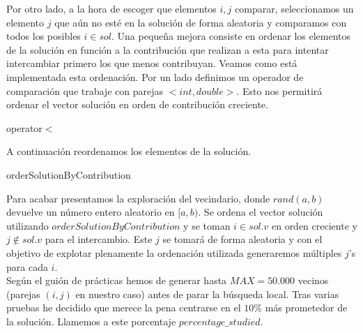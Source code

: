\documentclass[11pt,a4paper]{article}
\begin{document}
	Por otro lado, a la hora de escoger que elementos $i,j$ comparar, seleccionamos un elemento $j$ que aún no esté en la solución de forma aleatoria y comparamos con todos los posibles $i \in sol$. Una pequeña mejora consiste en ordenar los elementos de la solución en función a la contribución que realizan a esta para intentar intercambiar primero los que menos contribuyan. Veamos como está implementada esta ordenación. Por un lado definimos un operador de comparación que trabaje con parejas $<int, double>$. Esto nos permitirá ordenar el vector solución en orden de contribución creciente. \\
	
	\begin{algorithm}[H]
	 	\caption{operator$<$}
	\end{algorithm}

	A continuación reordenamos los elementos de la solución. \\

	\begin{algorithm}[H]
		\caption{orderSolutionByContribution}
	\end{algorithm}

	Para acabar presentamos la exploración del vecindario, donde $rand(a,b)$ devuelve un número entero aleatorio en $[a,b)$. Se ordena el vector solución utilizando $orderSolutionByContribution$ y se toman $i \in sol.v$ en orden creciente y $j \notin sol.v$ para el intercambio. Este $j$ se tomará de forma aleatoria y con el objetivo de explotar plenamente la ordenación utilizada generaremos múltiples $j$'s para cada $i$. \\
	
	Según el guión de prácticas hemos de generar hasta $MAX = 50.000$ vecinos (parejas $(i,j)$ en nuestro caso) antes de parar la búsqueda local. Tras varias pruebas he decidido que merece la pena centrarse en el $10\%$ más prometedor de la solución. Llamemos a este porcentaje $percentage\_studied$. \\
	
\end{document}
